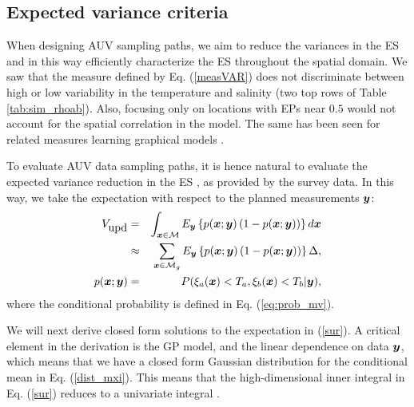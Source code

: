 \documentclass[aoas]{imsart}
\begin{document}
\subsection{Expected variance criteria}

When designing AUV sampling paths, we aim to reduce the variances in the ES and in this way efficiently characterize the ES throughout the spatial domain. We saw that the measure defined by Eq. (\ref{measVAR}) does not discriminate between high or low variability in the temperature and salinity (two top rows of Table \ref{tab:sim_rhoab}).
Also, focusing only on locations with EPs near $0.5$ would not account for the spatial correlation in the model.  
The same has been seen for related measures learning graphical models \citep{lilleborge2016information}.

To evaluate AUV data sampling paths, it is hence natural to evaluate the expected variance reduction in the ES  \citep{chevalier2014fast}, as provided by the survey data. In this way, we take the expectation with respect to the planned measurements ${\boldsymbol y}$:
\begin{eqnarray}\label{sur}
    V_{\mbox{upd}} &=& \int_{\bx \in \mathcal{M}} E_{\by} \left\{ p(\bx;\by)\left( 1-p(\bx;\by)\right) \right\} d\bx \\
    & \approx & \sum_{\bx \in \mathcal{M}_g} E_{\by} \left\{ p(\bx;\by)\left( 1-p(\bx;\by)\right) \right\} \Delta, \nonumber \\
    p(\bx;\by) &=& P(\xi_a(\bx) < T_a, \xi_b(\bx) < T_b |\by), \nonumber
\end{eqnarray}
where the conditional probability is defined in Eq. (\ref{eq:prob_mv}).

We will next derive closed form solutions to the expectation in (\ref{sur}). A critical
element in the derivation is the GP model, and the linear dependence on data ${\boldsymbol y}$, which means that we have a closed form Gaussian distribution for the conditional mean in Eq. (\ref{dist_mxi}). This means that the high-dimensional inner integral in Eq. (\ref{sur}) reduces to a univariate integral \citep{bhattacharjya2013value, chevalier2014fast}. 
\end{document}
